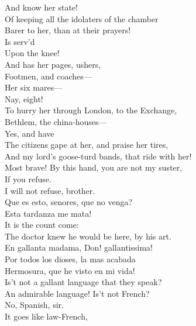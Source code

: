 \documentclass[a4paper,oneside]{memoir}
\begin{document}
\begin{drama*}
\subtlespeaks {} And know her state!\\
\facespeaks Of keeping all the idolaters of the chamber\\
Barer to her, than at their prayers!\\
\subtlespeaks {} Is serv'd\\
Upon the knee!\\
\facespeaks {} And has her pages, ushers,\\
Footmen, and coaches---\\
\subtlespeaks {} Her six mares---\\
\facespeaks {} Nay, eight!\\
\subtlespeaks To hurry her through London, to the Exchange,\\
Bethlem, the china-houses---\\
\facespeaks {} Yes, and have\\
The citizens gape at her, and praise her tires,\\
And my lord's goose-turd bands, that ride with her!\\
\kastrilspeaks Most brave! By this hand, you are not my suster,\\
If you refuse.\\
\pliantspeaks {} I will not refuse, brother.\\
\surlyspeaks Que es esto, senores, que no venga?\\
Esta tardanza me mata!\\
\facespeaks {} It is the count come:\\
The doctor knew he would be here, by his art.\\
\subtlespeaks En gallanta madama, Don! gallantissima!\\
\surlyspeaks Por todos los dioses, la mas acabada\\
Hermosura, que he visto en mi vida!\\
\facespeaks Is't not a gallant language that they speak?\\
\kastrilspeaks An admirable language! Is't not French?\\
\facespeaks No, Spanish, sir.\\
\kastrilspeaks {} It goes like law-French,\\

\end{drama*}
\end{document}
